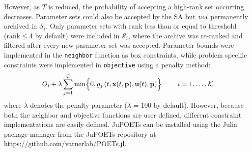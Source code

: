 \documentclass{bmcart}
\begin{document}
However, as $T$ is reduced, the probability of accepting a high-rank set occurring decreases.
Parameter sets could also be accepted by the SA but $\emph{not}$ permanently archived in $\mathcal{S}_{i}$.
Only parameter sets with rank less than or equal to threshold (rank$\leq$4 by default) were included in $\mathcal{S}_{i}$, where the archive was re-ranked and filtered after
every new parameter set was accepted.
Parameter bounds were implemented in the \texttt{neighbor} function as box constraints, while problem specific constraints were implemented in \texttt{objective} using a penalty method:
\begin{equation}
  O_{i}+\lambda\sum_{j=1}^{\mathcal{C}}\min\Bigl\{0,g_j\left(t,\mathbf{x}(t,\mathbf{p}),\mathbf{u}(t),\mathbf{p}\right)\Bigr\}\qquad~i=1,\hdots,\mathcal{K}
\end{equation}where $\lambda$ denotes the penalty parameter ($\lambda$ = 100 by default).
However, because both the neighbor and objective functions are user defined, different constraint implementations are easily defined.
JuPOETs can be installed using the Julia package manager from the JuPOETs repository at https://github.com/varnerlab/POETs.jl.
\end{document}
